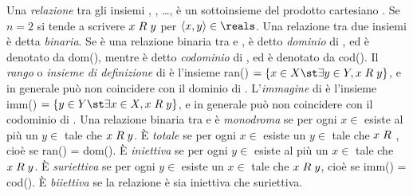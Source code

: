Una \textit{relazione} tra gli insiemi , , \dots,  è un sottoinsieme  del prodotto cartesiano . Se $n = 2$ si tende a scrivere $x \hspace{1mm} R \hspace{1mm} y$ per $\langle x, y \rangle \in \reals$. Una relazione tra due insiemi è detta \textit{binaria}. Se  è una relazione binaria tra  e ,  è detto \textit{dominio} di , ed è denotato da dom(), mentre  è detto \textit{codominio} di , ed è denotato da cod(). Il \textit{rango} o \textit{insieme di definizione} di  è l'insieme ran() $ = \{x \in X \st \exists y \in Y, x \hspace{1mm} R \hspace{1mm} y\}$, e in generale può non coincidere con il dominio di . L'\textit{immagine} di  è l'insieme imm() $= \{y \in Y \st \exists x \in X, x \hspace{1mm} R \hspace{1mm} y\}$, e in generale può non coincidere con il codominio di . Una relazione binaria  tra  e  è \textit{monodroma} se per ogni $x \in$  esiste al più un $y \in$  tale che $x \hspace{1mm} R \hspace{1mm} y$. È \textit{totale} se per ogni $x \in$  esiste un $y \in$  tale che $x \hspace{1mm} R \hspace{1mm}$, cioè se ran() = dom(). È \textit{iniettiva} se per ogni $y \in$  esiste al più un $x \in$  tale che $x \hspace{1mm} R \hspace{1mm} y$. È \textit{suriettiva} se per ogni $y \in$  esiste un $x \in$  tale che $x \hspace{1mm} R \hspace{1mm} y$, cioè se imm() = cod(). È \textit{biiettiva} se la relazione è sia iniettiva che suriettiva.
